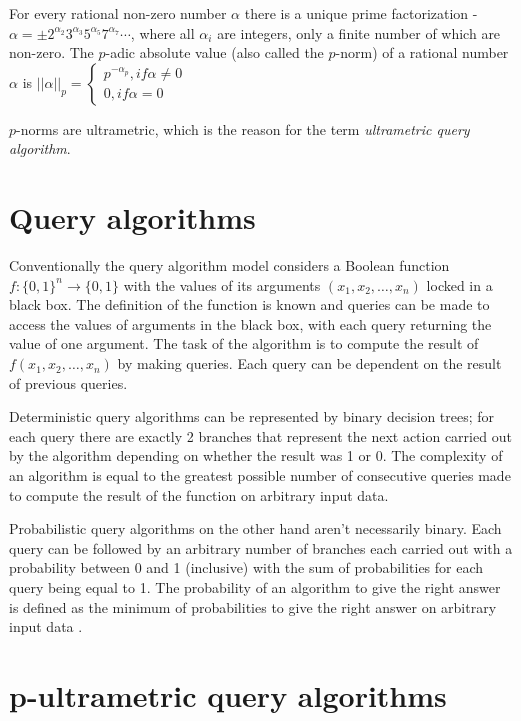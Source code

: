 \documentclass{llncs}
\begin{document}
For every rational non-zero number $\alpha$ there is a unique prime factorization - $\alpha = \pm 2^{\alpha_2}3^{\alpha_3}5^{\alpha_5}7^{\alpha_7} \cdots$, where all $\alpha_i$ are integers, only a finite number of which are non-zero. The $p$-adic absolute value (also called the $p$-norm) of a rational number $\alpha$ is 
$||\alpha||_p = \begin{cases}
p^{-\alpha_p}, if \alpha \neq 0 \\
0, if \alpha = 0
\end{cases} $

$p$-norms are ultrametric, which is the reason for the term \textit{ultrametric query algorithm}.

\section{Query algorithms}
Conventionally the query algorithm model considers a Boolean function $f:\{0,1\}^n\rightarrow\{0,1\}$ with the values of its arguments $(x_1,x_2,\ldots,x_n)$ locked in a black box. The definition of the function is known and queries can be made to access the values of arguments in the black box, with each query returning the value of one argument. The task of the algorithm is to compute the result of $f(x_1,x_2,\ldots,x_n)$ by making queries. Each query can be dependent on the result of previous queries.

Deterministic query algorithms can be represented by binary decision trees; for each query there are exactly 2 branches that represent the next action carried out by the algorithm depending on whether the result was 1 or 0. The complexity of an algorithm is equal to the greatest possible number of consecutive queries made to compute the result of the function on arbitrary input data.

Probabilistic query algorithms on the other hand aren't necessarily binary. Each query can be followed by an arbitrary number of branches each carried out with a probability between 0 and 1 (inclusive) with the sum of probabilities for each query being equal to 1. The probability of an algorithm to give the right answer is defined as the minimum of probabilities to give the right answer on arbitrary input data \cite{Buh02} \cite{Vas10}.

\section{p-ultrametric query algorithms}
\end{document}
